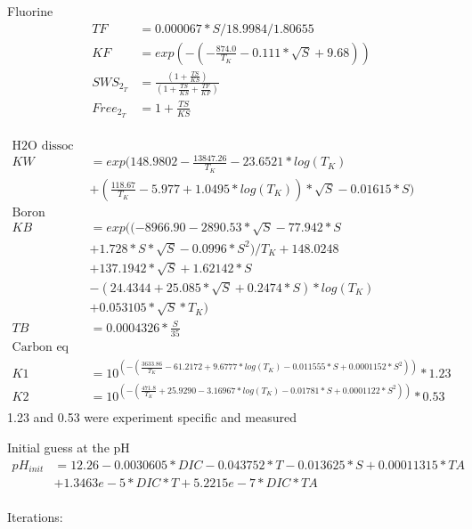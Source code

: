 \documentclass{ruthesis}
\begin{document}
Fluorine
\begin{align*}
TF       	&= 0.000067*S/18.9984/1.80655 \nonumber \\
KF       	&= exp(-(-\frac{874.0}{T_K} - 0.111*\sqrt{S} + 9.68)) \nonumber \\
SWS_{2_T}  	&= \frac{(1 + \frac{TS}{KS})}{(1 + \frac{TS}{KS} + \frac{TF}{KF})} \nonumber \\
Free_{2_T} 	&= 1 + \frac{TS}{KS} \nonumber \\
\end{align*}


\begin{align*}
\text{H2O dissoc} \nonumber \\
KW 		&= exp(148.9802 - \frac{13847.26}{T_K}  - 23.6521*log(T_K) \nonumber \\
		&+ (\frac{118.67}{T_K} - 5.977 + 1.0495*log(T_K))*\sqrt{S} - 0.01615*S) \nonumber \\
\text{Boron} \nonumber \\
KB 		&= exp((-8966.90 - 2890.53*\sqrt{S} - 77.942*S \nonumber \\
		&+ 1.728*S*\sqrt{S} - 0.0996*S^2)/T_K + 148.0248 \nonumber \\
		& + 137.1942*\sqrt{S} + 1.62142*S \nonumber \\
		&- (24.4344 + 25.085*\sqrt{S} + 0.2474*S)*log(T_K)  \nonumber \\ 
		&+ 0.053105*\sqrt{S}*T_K) \nonumber \\
TB 		&= 0.0004326*\frac{S}{35} \nonumber \\
\text{Carbon eq constants} \nonumber \\
K1 		&= 10^{(-(\frac{3633.86}{T_K} - 61.2172 + 9.6777 *log(T_K) - 0.011555*S + 0.0001152*S^2))}*1.23	\nonumber \\
K2 		&= 10^{(-(\frac{471.8}{T_K} + 25.9290 - 3.16967*log(T_K) - 0.01781*S + 0.0001122*S^2))}*0.53 \nonumber \\	
\end{align*}
1.23 and 0.53 were experiment specific and measured 


Initial guess at the pH 
\begin{align*}
pH_{init} 	&= 12.26 -0.0030605*DIC -0.043752*T -0.013625*S+ 0.00011315*TA \nonumber \\
&+ 1.3463e-5*DIC*T + 5.2215e-7*DIC*TA \nonumber \\
\end{align*}

Iterations:
\end{document}
